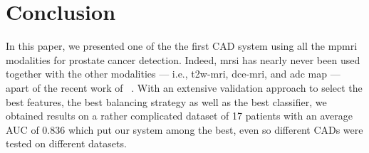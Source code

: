 \section{Conclusion}


In this paper, we presented one of the the first CAD system using  all the \ac{mpmri} modalities for prostate cancer detection.
 Indeed, \ac{mrsi} has nearly never been used together with the other modalities --- i.e., \ac{t2w}-\ac{mri}, \ac{dce}-\ac{mri}, and \ac{adc} map --- apart of the recent work of ~\cite{trigui2016classification,trigui2017automatic}. With an extensive validation approach  to select the best features, the best balancing strategy as well as the best classifier, we obtained results on a rather complicated dataset of 17 patients with an average AUC of 0.836 which put our system among the best, even so different CADs were tested on different datasets.


